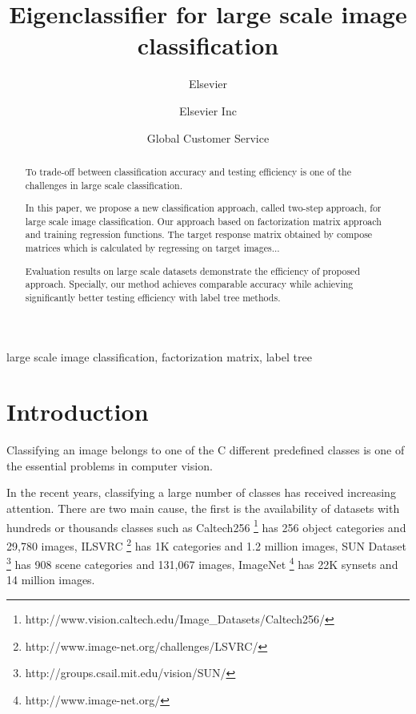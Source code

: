 \documentclass[preprint]{elsarticle}
\begin{document}
\begin{frontmatter}

\title{Eigenclassifier for large scale image classification}
\author{Elsevier}
\address{Radarweg 29, Amsterdam}

\author[mymainaddress,mysecondaryaddress]{Elsevier Inc}

\author[mysecondaryaddress]{Global Customer Service}

\address[mymainaddress]{1600 John F Kennedy Boulevard, Philadelphia}
\address[mysecondaryaddress]{360 Park Avenue South, New York}

\begin{abstract}
To trade-off between classification accuracy and testing efficiency is one of the challenges in large scale classification. 

In this paper, we propose a new classification approach, called two-step approach, for large scale image classification. Our approach based on factorization matrix approach and training regression functions. The target response matrix obtained by compose matrices which is calculated by regressing on target images... 

Evaluation results on large scale datasets demonstrate the efficiency of proposed approach. Specially, our method achieves comparable accuracy while achieving significantly better testing efficiency with label tree methods.

\end{abstract}

\begin{keyword}
large scale image classification, factorization matrix, label tree
\end{keyword}

\end{frontmatter}

\linenumbers

\section{Introduction}

Classifying an image belongs to one of the C different predefined classes is one of the essential problems in computer vision. 

In the recent years, classifying a large number of  classes  has received increasing attention. There are two main cause, the first is the availability of datasets with hundreds or thousands classes such as Caltech256 \footnote{http://www.vision.caltech.edu/Image\_Datasets/Caltech256/} has 256 object categories and 29,780 images, ILSVRC \footnote{http://www.image-net.org/challenges/LSVRC/} has 1K categories and 1.2 million images, 
SUN Dataset \footnote{http://groups.csail.mit.edu/vision/SUN/} has 908 scene categories and 131,067 images,
ImageNet  \footnote{http://www.image-net.org/} has 22K synsets and 14 million images.
\end{document}
